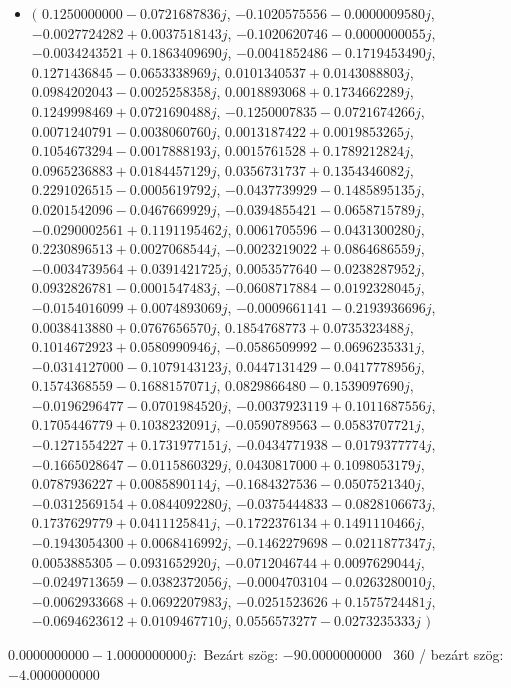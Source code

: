 \documentclass[14pt,a4paper]{article}
\begin{document}
\begin{itemize}
\item
$\big($
$0.1250000000-0.0721687836j$, $-0.1020575556-0.0000009580j$, $-0.0027724282+0.0037518143j$, $-0.1020620746-0.0000000055j$, $-0.0034243521+0.1863409690j$, $-0.0041852486-0.1719453490j$, $0.1271436845-0.0653338969j$, $0.0101340537+0.0143088803j$, $0.0984202043-0.0025258358j$, $0.0018893068+0.1734662289j$, $0.1249998469+0.0721690488j$, $-0.1250007835-0.0721674266j$, $0.0071240791-0.0038060760j$, $0.0013187422+0.0019853265j$, $0.1054673294-0.0017888193j$, $0.0015761528+0.1789212824j$, $0.0965236883+0.0184457129j$, $0.0356731737+0.1354346082j$, $0.2291026515-0.0005619792j$, $-0.0437739929-0.1485895135j$, $0.0201542096-0.0467669929j$, $-0.0394855421-0.0658715789j$, $-0.0290002561+0.1191195462j$, $0.0061705596-0.0431300280j$, $0.2230896513+0.0027068544j$, $-0.0023219022+0.0864686559j$, $-0.0034739564+0.0391421725j$, $0.0053577640-0.0238287952j$, $0.0932826781-0.0001547483j$, $-0.0608717884-0.0192328045j$, $-0.0154016099+0.0074893069j$, $-0.0009661141-0.2193936696j$, $0.0038413880+0.0767656570j$, $0.1854768773+0.0735323488j$, $0.1014672923+0.0580990946j$, $-0.0586509992-0.0696235331j$, $-0.0314127000-0.1079143123j$, $0.0447131429-0.0417778956j$, $0.1574368559-0.1688157071j$, $0.0829866480-0.1539097690j$, $-0.0196296477-0.0701984520j$, $-0.0037923119+0.1011687556j$, $0.1705446779+0.1038232091j$, $-0.0590789563-0.0583707721j$, $-0.1271554227+0.1731977151j$, $-0.0434771938-0.0179377774j$, $-0.1665028647-0.0115860329j$, $0.0430817000+0.1098053179j$, $0.0787936227+0.0085890114j$, $-0.1684327536-0.0507521340j$, $-0.0312569154+0.0844092280j$, $-0.0375444833-0.0828106673j$, $0.1737629779+0.0411125841j$, $-0.1722376134+0.1491110466j$, $-0.1943054300+0.0068416992j$, $-0.1462279698-0.0211877347j$, $0.0053885305-0.0931652920j$, $-0.0712046744+0.0097629044j$, $-0.0249713659-0.0382372056j$, $-0.0004703104-0.0263280010j$, $-0.0062933668+0.0692207983j$, $-0.0251523626+0.1575724481j$, $-0.0694623612+0.0109467710j$, $0.0556573277-0.0273235333j$
$\big)$
\end{itemize}
$0.0000000000-1.0000000000j$:\
Bezárt szög: $-90.0000000000$ \
360 / bezárt szög: $-4.0000000000$\
\end{document}
